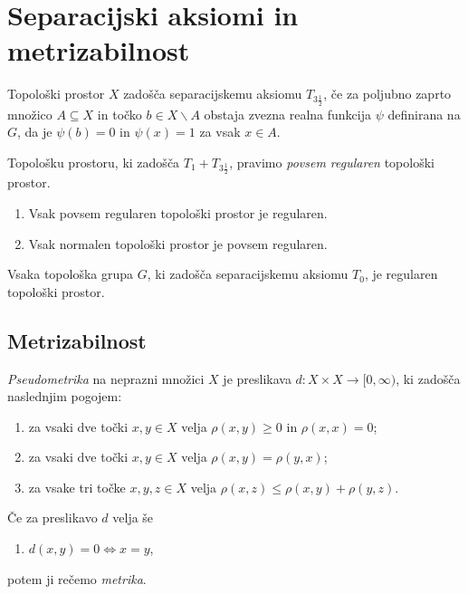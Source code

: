 \documentclass[mat1]{fmfdelo}
\begin{document}
\section{Separacijski aksiomi in metrizabilnost}

\begin{definicija}
Topološki prostor $X$ zadošča separacijskemu aksiomu $T_{3 \frac{1}{2}}$, če za poljubno zaprto množico $A \subseteq X$ in točko $b \in X\backslash A$ obstaja zvezna realna funkcija $\psi$ definirana na $G$, da je $\psi (b) = 0$ in $\psi (x) = 1$ za vsak $x \in A$.
\end{definicija}

\begin{opomba}
Topološku prostoru, ki zadošča $T_1+T_{3 \frac{1}{2}}$, pravimo \emph{povsem regularen} topološki prostor.
\end{opomba}


\begin{trditev}\label{pos:reghaus}
	\begin{enumerate}
		\item Vsak povsem regularen topološki prostor je regularen.
		\item Vsak normalen topološki prostor je povsem regularen.
	\end{enumerate}
\end{trditev}


\begin{izrek}\label{izr:t3}
	Vsaka topološka grupa $G$, ki zadošča separacijskemu aksiomu $T_0$, je regularen topološki prostor.
\end{izrek}

\subsection{Metrizabilnost}

\begin{definicija}\label{def:metrika}
	\emph{Pseudometrika} na neprazni množici $X$ je preslikava $d: X \times X \to  [0, \infty)$, ki zadošča naslednjim pogojem:
	\begin{enumerate}
		\item za vsaki dve točki $x, y \in X$ velja $\rho (x, y) \geq 0$ in $\rho (x, x) = 0$;
		\item za vsaki dve točki $x, y \in X$ velja $\rho (x, y) = \rho (y, x)$;
		\item za vsake tri točke $x, y, z \in X$ velja $\rho (x, z) \leq \rho (x, y) + \rho (y, z)$.
	\end{enumerate}
	Če za preslikavo $d$ velja še
	\begin{enumerate}[resume]
		\item $d(x,y) = 0 \iff x = y$,
	\end{enumerate}
	potem ji rečemo \emph{metrika}.
\end{definicija}
\end{document}
